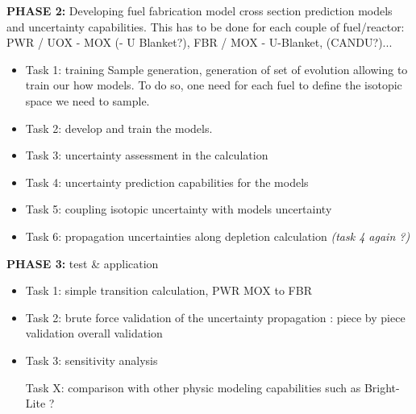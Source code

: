 \documentclass[dvips,12pt]{article}
\begin{document}
\noindent\textbf{PHASE 2:} Developing fuel fabrication model cross section prediction models and uncertainty capabilities. This has to be done for each couple of fuel/reactor: PWR / UOX - MOX (- U Blanket?), FBR / MOX - U-Blanket, (CANDU?)...
\begin{itemize}
\item Task 1: training Sample generation, generation of set of evolution allowing to train our how models.
To do so, one need for each fuel to define the isotopic space we need to sample. 
\item Task 2: develop and train the models.
\item Task 3: uncertainty assessment in the calculation
\item Task 4: uncertainty prediction capabilities for the models
\item Task 5: coupling isotopic uncertainty with models uncertainty
\item Task 6: propagation uncertainties along depletion calculation \textit{(task 4 again ?)}
\end{itemize}
 
\noindent\textbf{PHASE 3:} test \& application
\begin{itemize}
\item Task 1: simple transition calculation, PWR MOX to FBR
\item Task 2: brute force validation of the uncertainty propagation :
piece by piece validation
overall validation
\item Task 3: sensitivity analysis

Task X: comparison with other physic modeling capabilities such as Bright-Lite ?
\end{itemize}
 












\end{document}

